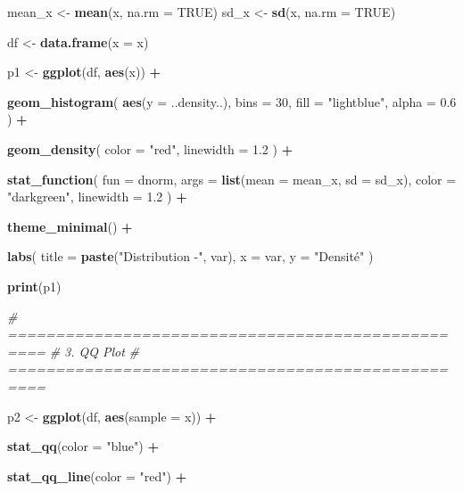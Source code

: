 \documentclass[
]{article}
\newenvironment{Shaded}{\begin{snugshade}}{\end{snugshade}}
\newcommand{\AttributeTok}[1]{\textcolor[rgb]{0.13,0.29,0.53}{#1}}
\newcommand{\CommentTok}[1]{\textcolor[rgb]{0.56,0.35,0.01}{\textit{#1}}}
\newcommand{\ConstantTok}[1]{\textcolor[rgb]{0.56,0.35,0.01}{#1}}
\newcommand{\DecValTok}[1]{\textcolor[rgb]{0.00,0.00,0.81}{#1}}
\newcommand{\FloatTok}[1]{\textcolor[rgb]{0.00,0.00,0.81}{#1}}
\newcommand{\FunctionTok}[1]{\textcolor[rgb]{0.13,0.29,0.53}{\textbf{#1}}}
\newcommand{\NormalTok}[1]{#1}
\newcommand{\OtherTok}[1]{\textcolor[rgb]{0.56,0.35,0.01}{#1}}
\newcommand{\SpecialCharTok}[1]{\textcolor[rgb]{0.81,0.36,0.00}{\textbf{#1}}}
\newcommand{\StringTok}[1]{\textcolor[rgb]{0.31,0.60,0.02}{#1}}
\begin{document}
\begin{Shaded}
\begin{Highlighting}[]
\NormalTok{mean\_x }\OtherTok{\textless{}{-}} \FunctionTok{mean}\NormalTok{(x, }\AttributeTok{na.rm =} \ConstantTok{TRUE}\NormalTok{)}
\NormalTok{sd\_x }\OtherTok{\textless{}{-}} \FunctionTok{sd}\NormalTok{(x, }\AttributeTok{na.rm =} \ConstantTok{TRUE}\NormalTok{)}

\NormalTok{df }\OtherTok{\textless{}{-}} \FunctionTok{data.frame}\NormalTok{(}\AttributeTok{x =}\NormalTok{ x)}

\NormalTok{p1 }\OtherTok{\textless{}{-}} \FunctionTok{ggplot}\NormalTok{(df, }\FunctionTok{aes}\NormalTok{(x)) }\SpecialCharTok{+}

\FunctionTok{geom\_histogram}\NormalTok{(}
\FunctionTok{aes}\NormalTok{(}\AttributeTok{y =}\NormalTok{ ..density..),}
\AttributeTok{bins =} \DecValTok{30}\NormalTok{,}
\AttributeTok{fill =} \StringTok{"lightblue"}\NormalTok{,}
\AttributeTok{alpha =} \FloatTok{0.6}
\NormalTok{) }\SpecialCharTok{+}

\FunctionTok{geom\_density}\NormalTok{(}
\AttributeTok{color =} \StringTok{"red"}\NormalTok{,}
\AttributeTok{linewidth =} \FloatTok{1.2}
\NormalTok{) }\SpecialCharTok{+}

\FunctionTok{stat\_function}\NormalTok{(}
\AttributeTok{fun =}\NormalTok{ dnorm,}
\AttributeTok{args =} \FunctionTok{list}\NormalTok{(}\AttributeTok{mean =}\NormalTok{ mean\_x, }\AttributeTok{sd =}\NormalTok{ sd\_x),}
\AttributeTok{color =} \StringTok{"darkgreen"}\NormalTok{,}
\AttributeTok{linewidth =} \FloatTok{1.2}
\NormalTok{) }\SpecialCharTok{+}

\FunctionTok{theme\_minimal}\NormalTok{() }\SpecialCharTok{+}

\FunctionTok{labs}\NormalTok{(}
\AttributeTok{title =} \FunctionTok{paste}\NormalTok{(}\StringTok{"Distribution {-}"}\NormalTok{, var),}
\AttributeTok{x =}\NormalTok{ var,}
\AttributeTok{y =} \StringTok{"Densité"}
\NormalTok{)}

\FunctionTok{print}\NormalTok{(p1)}

\CommentTok{\# ==================================================}
\CommentTok{\# 3. QQ Plot}
\CommentTok{\# ==================================================}

\NormalTok{p2 }\OtherTok{\textless{}{-}} \FunctionTok{ggplot}\NormalTok{(df, }\FunctionTok{aes}\NormalTok{(}\AttributeTok{sample =}\NormalTok{ x)) }\SpecialCharTok{+}

\FunctionTok{stat\_qq}\NormalTok{(}\AttributeTok{color =} \StringTok{"blue"}\NormalTok{) }\SpecialCharTok{+}

\FunctionTok{stat\_qq\_line}\NormalTok{(}\AttributeTok{color =} \StringTok{"red"}\NormalTok{) }\SpecialCharTok{+}


\end{Highlighting}
\end{Shaded}
\end{document}
